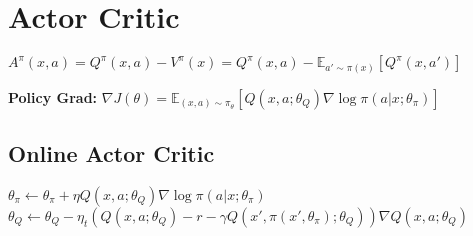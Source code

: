 \begin{comment}
	\pagebreak
\end{comment}

\section{Actor Critic}
$A^\pi(x,a) = Q^\pi(x,a) - V^\pi(x)= Q^\pi(x,a) - \mathbb{E}_{a'\sim \pi(x)}[Q^\pi(x,a')]$\\
\begin{comment}
	The advantage is the difference of the reward we getaaby taking action a in state x, and the expected reward we get in state x taking the action from our current policy.\\
	When the advantage function is positive, it is an action we want to play, if it is negative, we rather not want to play the action. This is different than with the Q value.\\
\end{comment}

 \textbf{Policy Grad:} $\nabla J(\theta) = \mathbb{E}_{(x,a) \sim \pi_\theta}[Q(x,a; \theta_Q) \nabla \log \pi(a | x;\theta_\pi)]$\\
 \begin{comment}
 	Gradient is expectation over state-action pairs, properly discounted by how much we visit this state action pair in $\pi$, times the action-value function of that state-action pair.\\
 	\textbf{Actor:} Parameterised policy\\
 	\textbf{Critic:} The parameterised estimate of the action-state value, also known as Q value.\\
 	When computing this expectation, we often use one-step approximations. This introduces variance, which we can reduce by subtracting a baseline again.\\
 \end{comment}
 
 \subsection{Online Actor Critic}
 $\theta_\pi \leftarrow \theta_\pi + \eta Q(x,a;\theta_Q) \nabla \log \pi(a | x;\theta_\pi)$\\
 $\theta_Q \leftarrow \theta_Q - \eta_t( Q(x,a; \theta_Q) - r - \gamma Q(x', \pi(x', \theta_\pi); \theta_Q)) \nabla Q(x,a; \theta_Q)$\\
\begin{comment}
	Guaranteed to improve under certain conditions.\\
\end{comment}

